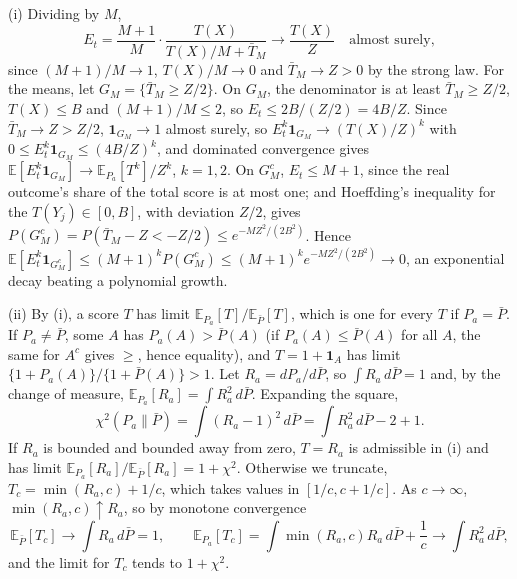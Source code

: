 \documentclass[pdflatex,sn-mathphys-ay]{sn-jnl}
\newcommand{\E}{\mathbb{E}}
\theoremstyle{thmstyleone}
\theoremstyle{thmstyletwo}
\begin{document}
\begin{appendices}
(i) Dividing by $M$,
\[
E_t = \frac{M+1}{M}\cdot\frac{T(X)}{T(X)/M + \bar T_M} \to \frac{T(X)}{Z}
\quad\text{almost surely},
\]
since $(M+1)/M \to 1$, $T(X)/M \to 0$ and $\bar T_M \to Z > 0$ by the strong law.
For the means, let $G_M = \{\bar T_M \ge Z/2\}$. On $G_M$, the denominator is at
least $\bar T_M \ge Z/2$, $T(X) \le B$ and $(M+1)/M \le 2$, so
$E_t \le 2B/(Z/2) = 4B/Z$. Since $\bar T_M \to Z > Z/2$,
$\mathbf 1_{G_M} \to 1$ almost surely, so $E_t^k\mathbf 1_{G_M} \to (T(X)/Z)^k$
with $0 \le E_t^k\mathbf 1_{G_M} \le (4B/Z)^k$, and dominated convergence gives
$\E[E_t^k\mathbf 1_{G_M}] \to \E_{P_a}[T^k]/Z^k$, $k = 1, 2$. On $G_M^c$, $E_t \le M+1$, since the real outcome's
share of the total score is at most one; and Hoeffding's inequality
\citep{hoeffding1963probability} for the $T(Y_j) \in [0, B]$, with deviation
$Z/2$, gives $P(G_M^c) = P(\bar T_M - Z < -Z/2) \le e^{-MZ^2/(2B^2)}$. Hence
$\E[E_t^k\mathbf 1_{G_M^c}] \le (M+1)^k P(G_M^c) \le (M+1)^k e^{-MZ^2/(2B^2)} \to 0$,
an exponential decay beating a polynomial growth.

(ii) By (i), a score $T$ has limit $\E_{P_a}[T]/\E_{\bar P}[T]$, which is one
for every $T$ if $P_a = \bar P$. If $P_a \ne \bar P$, some $A$ has
$P_a(A) > \bar P(A)$ (if $P_a(A) \le \bar P(A)$ for all $A$, the same for $A^c$
gives $\ge$, hence equality), and $T = 1 + \mathbf 1_A$ has limit
$\{1 + P_a(A)\}/\{1 + \bar P(A)\} > 1$. Let $R_a = dP_a/d\bar P$, so
$\int R_a\, d\bar P = 1$ and, by the change of measure,
$\E_{P_a}[R_a] = \int R_a^2\, d\bar P$. Expanding the square,
\[
\chi^2(P_a\|\bar P) = \int (R_a - 1)^2\, d\bar P = \int R_a^2\, d\bar P - 2 + 1 .
\]
If $R_a$ is bounded and bounded away from zero, $T = R_a$ is admissible in (i)
and has limit $\E_{P_a}[R_a]/\E_{\bar P}[R_a] = 1 + \chi^2$. Otherwise we
truncate, $T_c = \min(R_a, c) + 1/c$, which takes values in $[1/c, c + 1/c]$.
As $c \to \infty$,
$\min(R_a, c) \uparrow R_a$, so by monotone convergence
\[
\E_{\bar P}[T_c] \to \int R_a\, d\bar P = 1,
\qquad
\E_{P_a}[T_c] = \int \min(R_a, c) R_a\, d\bar P + \frac1c \to \int R_a^2\, d\bar P,
\]
and the limit for $T_c$ tends to $1 + \chi^2$.


\end{appendices}
\end{document}
